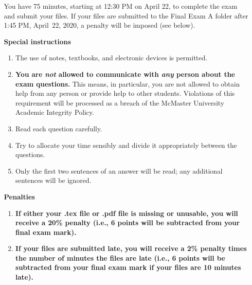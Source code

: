 \documentclass[12pt,fleqn]{article}
\begin{document}
You have 75 minutes, starting at 12:30 PM on April 22, to complete the
exam and submit your files.  If your files are submitted to the Final
Exam A folder after 1:45 PM, April~22, 2020, a penalty will be imposed
(see below).

\bigskip

\noindent
\textbf{Special instructions}

\begin{enumerate}

  \item The use of notes, textbooks, and electronic devices is
    permitted.

  \item \textbf{You are \emph{not} allowed to communicate with
    \emph{any} person about the exam questions.}  This means, in
    particular, you are not allowed to obtain help from any person or
    provide help to other students.  Violations of this requirement
    will be processed as a breach of the McMaster University Academic
    Integrity Policy.

  \item Read each question carefully.

  \item Try to allocate your time sensibly and divide it appropriately
    between the questions.

  \item Only the first two sentences of an answer will be read; any
    additional sentences will be ignored.

\end{enumerate}

\noindent
\textbf{Penalties}

\begin{enumerate}

  \item \textbf{If either your .tex file or .pdf file is missing or
    unusable, you will receive a 20\% penalty (i.e., 6 points will be
    subtracted from your final exam mark).}

  \item \textbf{If your files are submitted late, you will receive a
    2\% penalty times the number of minutes the files are late (i.e.,
    6 points will be subtracted from your final exam mark if your
    files are 10 minutes late).}

\end{enumerate}

\end{document}

